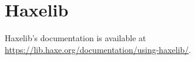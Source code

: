 \chapter{Haxelib}
\label{haxelib}

Haxelib's documentation is available at \href{https://lib.haxe.org/documentation/using-haxelib/}{https://lib.haxe.org/documentation/using-haxelib/}.
